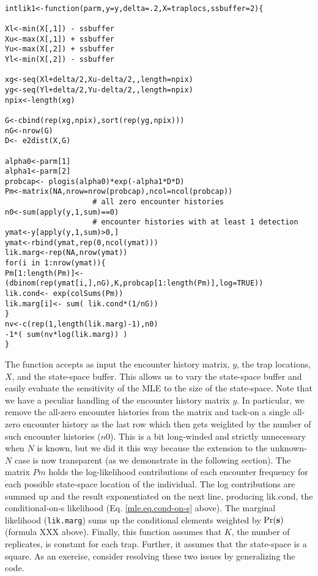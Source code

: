 {\small 
\begin{verbatim}

intlik1<-function(parm,y=y,delta=.2,X=traplocs,ssbuffer=2){

Xl<-min(X[,1]) - ssbuffer 
Xu<-max(X[,1]) + ssbuffer
Yu<-max(X[,2]) + ssbuffer
Yl<-min(X[,2]) - ssbuffer

xg<-seq(Xl+delta/2,Xu-delta/2,,length=npix) 
yg<-seq(Yl+delta/2,Yu-delta/2,,length=npix) 
npix<-length(xg)

G<-cbind(rep(xg,npix),sort(rep(yg,npix)))
nG<-nrow(G)
D<- e2dist(X,G)  

alpha0<-parm[1]
alpha1<-parm[2]
probcap<- plogis(alpha0)*exp(-alpha1*D*D)
Pm<-matrix(NA,nrow=nrow(probcap),ncol=ncol(probcap))
                    # all zero encounter histories
n0<-sum(apply(y,1,sum)==0) 
                    # encounter histories with at least 1 detection
ymat<-y[apply(y,1,sum)>0,] 
ymat<-rbind(ymat,rep(0,ncol(ymat)))
lik.marg<-rep(NA,nrow(ymat))
for(i in 1:nrow(ymat)){
Pm[1:length(Pm)]<- (dbinom(rep(ymat[i,],nG),K,probcap[1:length(Pm)],log=TRUE))
lik.cond<- exp(colSums(Pm))
lik.marg[i]<- sum( lik.cond*(1/nG))  
}
nv<-c(rep(1,length(lik.marg)-1),n0)
-1*( sum(nv*log(lik.marg)) )
}
\end{verbatim}
}


The function accepts as
input the encounter history matrix, $y$, the trap locations, $X$, and the
state-space buffer. This allows us to vary the state-space buffer and
easily evaluate the sensitivity of the MLE to the size of the
state-space. 
Note that we have a peculiar handling of the encounter history
matrix $y$. In particular, we remove the all-zero encounter histories
from the matrix and tack-on a single all-zero encounter history as the
last row which then gets weighted by the number of such encounter
histories ($n0$). This is a bit long-winded and strictly unnecessary
when $N$ is known, but we did it this way because the extension to the
unknown-$N$ case is now transparent (as we demonstrate in the following
section). 
 The matrix $Pm$ holds the log-likelihood contributions of
each encounter frequency for each possible state-space location of the
individual. 
The log contributions are summed up and the result
exponentiated on the next line, producing lik.cond, the
conditional-on-s likelihood (Eq. \ref{mle.eq.cond-on-s}
above). The marginal
likelihood (\mbox{\tt lik.marg}) sums up the conditional elements weighted by
$\Pr({\bf s})$ (formula XXX above).
Finally, this function assumes that $K$, the number
of replicates, is constant for each trap. Further, it assumes that the
state-space is a square. As an exercise, consider resolving these two
issues by generalizing the code.

